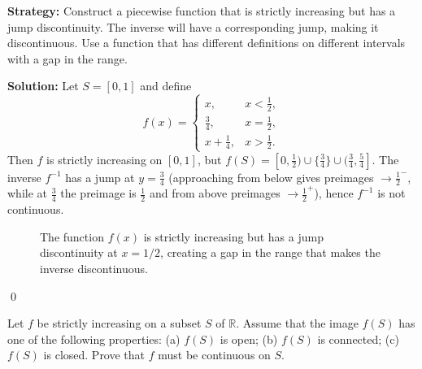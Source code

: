 \noindent\textbf{Strategy:} Construct a piecewise function that is strictly increasing but has a jump discontinuity. The inverse will have a corresponding jump, making it discontinuous. Use a function that has different definitions on different intervals with a gap in the range.

\bigskip\noindent\textbf{Solution:}
Let $S=[0,1]$ and define
\[
f(x)=\begin{cases}
x,& x<\tfrac12,\\
\tfrac34,& x=\tfrac12,\\
x+\tfrac14,& x>\tfrac12.
\end{cases}
\]
Then $f$ is strictly increasing on $[0,1]$, but $f(S)=[0,\tfrac12)\cup\{\tfrac34\}\cup(\tfrac34,\tfrac54]$. The inverse $f^{-1}$ has a jump at $y=\tfrac34$ (approaching from below gives preimages $\to\tfrac12^-$, while at $\tfrac34$ the preimage is $\tfrac12$ and from above preimages $\to\tfrac12^+$), hence $f^{-1}$ is not continuous.

\begin{figure}[h]
\centering
{}
\caption{The function $f(x)$ is strictly increasing but has a jump discontinuity at $x=1/2$, creating a gap in the range that makes the inverse discontinuous.}
\end{figure}\qed



\begin{problembox}
\begin{problemstatement}
Let $f$ be strictly increasing on a subset $S$ of $\mathbb{R}$. Assume that the image $f(S)$ has one of the following properties: 
(a) $f(S)$ is open; (b) $f(S)$ is connected; (c) $f(S)$ is closed. Prove that $f$ must be continuous on $S$.
\end{problemstatement}
\end{problembox}

